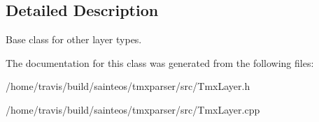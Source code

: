 \subsection{Detailed Description}
Base class for other layer types. 

The documentation for this class was generated from the following files\-:\begin{DoxyCompactItemize}
\item 
/home/travis/build/sainteos/tmxparser/src/Tmx\-Layer.\-h\item 
/home/travis/build/sainteos/tmxparser/src/Tmx\-Layer.\-cpp\end{DoxyCompactItemize}
